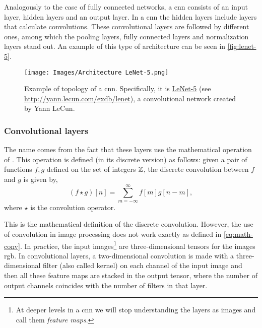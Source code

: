 Analogously to the case of fully connected networks, a \gls{cnn} consists of an
input layer, hidden layers and an output layer. In a \gls{cnn} the hidden
layers include layers that calculate convolutions. These convolutional layers
are followed by different ones, among which the pooling layers, fully connected
layers and normalization layers stand out. An example of this type of
architecture can be seen in \vref{fig:lenet-5}.

\begin{figure}[ht]
  \centering
  \texttt{[image: Images/Architecture LeNet-5.png]}
  \caption[Example of topology of a  (LeNet-5)]{Example of
    topology of a \gls{cnn}. Specifically, it is
    \href{http://yann.lecun.com/exdb/lenet}{LeNet-5} (see
    \url{http://yann.lecun.com/exdb/lenet}), a convolutional network created by
    Yann LeCun.}\label{fig:lenet-5}
\end{figure}

\subsubsection{Convolutional layers}

The name comes from the fact that these layers use the mathematical operation
of . This
operation is defined (in its discrete version) as follows: given a pair of
functions \(f, g\) defined on the set of integers \(\mathbb{Z}\), the discrete
convolution between \(f\) and \(g\) is given by,
\begin{equation} \label{eq:math-conv}
  (f \star g)[n] = \sum_{m=-\infty}^{\infty} f[m]g[n - m],
\end{equation}
where \(\star\) is the convolution operator.

This is the mathematical definition of the discrete convolution. However, the
use of convolution in image processing does not work exactly as defined in
\vref{eq:math-conv}. In practice, the input images\footnote{At deeper levels in
  a \gls{cnn} we will stop understanding the layers as images and call them
  \emph{feature maps}.} are three-dimensional tensors for the images
\acs{rgb}. In convolutional layers, a two-dimensional convolution is made with
a three-dimensional filter (also called kernel) on each channel of the input
image and then all these feature maps are stacked in the output tensor, where
the number of output channels coincides with the number of filters in that
layer.

